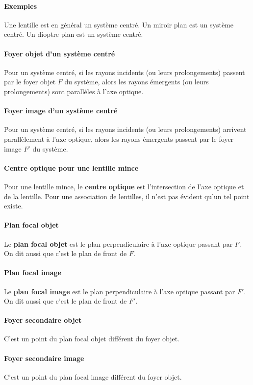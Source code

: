 \documentclass[french]{book}
\theoremstyle{plain}
\theoremstyle{definition}
\theoremstyle{remark}
\begin{document}
\paragraph{Exemples} Une lentille est en général un système centré. Un miroir plan est un système centré. Un dioptre plan est un système centré.
\paragraph{Foyer objet d'un système centré} Pour un système centré, si les rayons incidents (ou leurs prolongements) passent par le foyer objet $F$ du système, alors les rayons émergents (ou leurs prolongements) sont parallèles à l'axe optique.
\paragraph{Foyer image d'un système centré} Pour un système centré, si les rayons incidents (ou leurs prolongements) arrivent parallèlement à l'axe optique, alors les rayons émergents passent par le foyer image $F'$ du système.
\paragraph{Centre optique pour une lentille mince} Pour une lentille mince, le \textbf{centre optique} est l'intersection de l'axe optique et de la lentille. Pour une association de lentilles, il n'est pas évident qu'un tel point existe.
\paragraph{Plan focal objet} Le \textbf{plan focal objet} est le plan perpendiculaire à l'axe optique passant par $F$. On dit aussi que c'est le plan de front de $F$.
\paragraph{Plan focal image} Le \textbf{plan focal image} est le plan perpendiculaire à l'axe optique passant par $F'$. On dit aussi que c'est le plan de front de $F'$.
\paragraph{Foyer secondaire objet} C'est un point du plan focal objet différent du foyer objet.
\paragraph{Foyer secondaire image} C'est un point du plan focal image différent du foyer objet.
\end{document}
